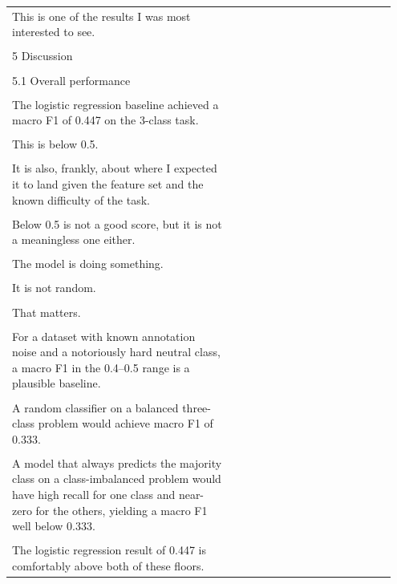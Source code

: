 \documentclass[11pt]{article}
\begin{document}
\begin{longtable}{|p{0.55\linewidth}|p{0.40\linewidth}|}
\rule{0pt}{3.5cm} & \\
\hline
This is one of the results I was most interested to see. & \\[2pt]
\hline
\rule{0pt}{3.5cm} & \\
\hline
5 Discussion & \\[2pt]
\hline
\rule{0pt}{3.5cm} & \\
\hline
5.1 Overall performance & \\[2pt]
\hline
\rule{0pt}{3.5cm} & \\
\hline
The logistic regression baseline achieved a macro F1 of 0.447 on the 3-class task. & \\[2pt]
\hline
\rule{0pt}{3.5cm} & \\
\hline
This is below 0.5. & \\[2pt]
\hline
\rule{0pt}{3.5cm} & \\
\hline
It is also, frankly, about where I expected it to land given the feature set and the known difficulty of the task. & \\[2pt]
\hline
\rule{0pt}{3.5cm} & \\
\hline
Below 0.5 is not a good score, but it is not a meaningless one either. & \\[2pt]
\hline
\rule{0pt}{3.5cm} & \\
\hline
The model is doing something. & \\[2pt]
\hline
\rule{0pt}{3.5cm} & \\
\hline
It is not random. & \\[2pt]
\hline
\rule{0pt}{3.5cm} & \\
\hline
That matters. & \\[2pt]
\hline
\rule{0pt}{3.5cm} & \\
\hline
For a dataset with known annotation noise and a notoriously hard neutral class, a macro F1 in the 0.4--0.5 range is a plausible baseline. & \\[2pt]
\hline
\rule{0pt}{3.5cm} & \\
\hline
A random classifier on a balanced three-class problem would achieve macro F1 of 0.333. & \\[2pt]
\hline
\rule{0pt}{3.5cm} & \\
\hline
A model that always predicts the majority class on a class-imbalanced problem would have high recall for one class and near-zero for the others, yielding a macro F1 well below 0.333. & \\[2pt]
\hline
\rule{0pt}{3.5cm} & \\
\hline
The logistic regression result of 0.447 is comfortably above both of these floors. & \\[2pt]

\end{longtable}
\end{document}
